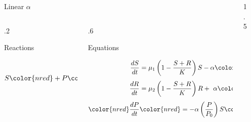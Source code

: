 \documentclass[final]{beamer}
\newlength{\sepwid}
\newlength{\onecolwid}
\begin{document}
\begin{frame}[t]
\begin{block}
\begin{columns}[t]
\begin{column}{\onecolwid}
\begin{block}{Linear $\alpha$}
    \begin{columns}[t]
      \begin{column}{.2\onecolwid}
        \begin{center}
          Reactions
        \end{center}
        \begin{align*}
          S & \stackrel{b_S}{\rightarrow} 2S \\
          S \color{nred}+ P\color{black} & \stackrel{\alpha}{\rightarrow}  R \\[0.8ex]
          R &\stackrel{b_R}{\rightarrow} 2R \\
          R &\stackrel{\delta}{\rightarrow} \varnothing
        \end{align*}
      \end{column}
        \vrule
      \begin{column}{.6\onecolwid}
        \begin{center}
          Equations
        \end{center}

        \begin{align*}
          \frac{dS}{dt} & = \mu_1 \left(1 - \frac{S + R}{K}\right)S - \alpha
            \color{nred}\left( \frac{P}{P_0} \right)\color{black} S \\[0.8ex]
          \frac{dR}{dt} & = \mu_2 \left(1 - \frac{S + R}{K}\right)R + \
            \alpha \color{nred}\left( \frac{P}{P_0} \right)\color{black} S - \delta R \\[0.8ex]
          \color{nred} \frac{dP}{dt} & \color{nred} = -\alpha \left( \frac{P}{P_0} \right) S \color{black}
        \end{align*}
      \end{column}
    \end{columns}
  \end{block}
\end{column}


\vrule width 5pt
\begin{column}{1.5\sepwid}\end{column} %
\begin{column}{\onecolwid}


\end{column}
\end{columns}
\end{block}
\end{frame}
\end{document}
